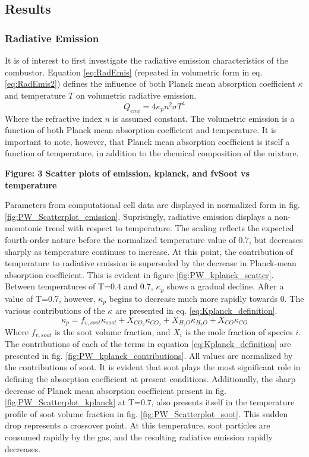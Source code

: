 \subsection{Results}

\subsubsection{Radiative Emission}
It is of interest to first investigate the radiative emission characteristics of the combustor.
Equation \ref{eq:RadEmis} (repeated in volumetric form in eq. \ref{eq:RadEmis2}) defines the influence of both Planck mean absorption coefficient $\kappa{}$ and temperature $T$ on volumetric radiative emission.
\begin{equation}
    Q_{emi}=4\kappa{}_{p}n^2\sigma{}T^4
    \label{eq:RadEmis2}
\end{equation}
Where the refractive index $n$ is assumed constant. 
The volumetric emission is a function of both Planck mean absorption coefficient and temperature. It is important to note, however, that Planck mean absorption coefficient is itself a function of temperature, in addition to the chemical composition of the mixture. 

\textbf{Figure: 3 Scatter plots of emission, kplanck, and fvSoot vs temperature}

Parameters from computational cell data are displayed in normalized form in fig. \ref{fig:PW_Scatterplot_emission}. 
Suprisingly, radiative emission displays a non-monotonic trend with respect to temperature. The scaling reflects the expected fourth-order nature before the normalized temperature value of $0.7$, but decreases sharply as temperature continues to increase.
At this point, the contribution of temperature to radiative emission is superseded by the decrease in Planck-mean absorption coefficient.
This is evident in figure \ref{fig:PW_kplanck_scatter}.
Between temperatures of T=$0.4$ and $0.7$, $\kappa{}_p$ shows a gradual decline. After a value of T=$0.7$, however, $\kappa{}_{p}$ begins to decrease much more rapidly towards $0$. 
The various contributions of the $\kappa{}$ are presented in eq. \ref{eq:Kplanck_definition}.
\begin{equation}
    \kappa{}_p=f_{v,soot}\kappa{}_{soot}+X_{CO_2}\kappa{}_{CO_2}+X_{H_2O}\kappa{}_{H_2O}+X_{CO}\kappa{}_{CO}
    \label{eq:Kplanck_definition}
\end{equation}
Where $f_{v,soot}$ is the soot volume fraction, and $X_i$ is the mole fraction of species $i$.
The contributions of each of the terms in equation \ref{eq:Kplanck_definition} are presented in fig. \ref{fig:PW_kplanck_contributions}. All values are normalized by the contributions of soot.
It is evident that soot plays the most significant role in defining the absorption coefficient at present conditions. Additionally, the sharp decrease of Planck mean absorption coefficient present in fig. \ref{fig:PW_Scatterplot_kplanck} at T=$0.7$, also presents itself in the temperature profile of soot volume fraction in fig. \ref{fig:PW_Scatterplot_soot}.
This sudden drop represents a crossover point. At this temperature, soot particles are consumed rapidly by the gas, and the resulting radiative emission rapidly decreases.

